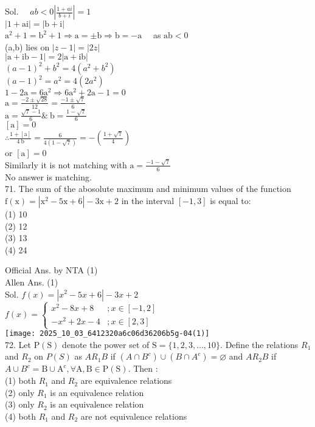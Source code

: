 \documentclass[10pt]{article}
\begin{document}
Sol. \(\quad a b<0\left|\frac{1+a i}{b+i}\right|=1\)\\
\(|1+\mathrm{ai}|=|\mathrm{b}+\mathrm{i}|\)\\
\(\mathrm{a}^{2}+1=\mathrm{b}^{2}+1 \Rightarrow \mathrm{a}= \pm \mathrm{b} \Rightarrow \mathrm{b}=-\mathrm{a} \quad\) as \(\mathrm{ab}<0\)\\
(a,b) lies on \(|z-1|=|2 z|\)\\
\(|\mathrm{a}+\mathrm{ib}-1|=2|\mathrm{a}+\mathrm{ib}|\)\\
\((a-1)^{2}+b^{2}=4\left(a^{2}+b^{2}\right)\)\\
\((a-1)^{2}=a^{2}=4\left(2 a^{2}\right)\)\\
\(1-2 \mathrm{a}=6 \mathrm{a}^{2} \Rightarrow 6 \mathrm{a}^{2}+2 \mathrm{a}-1=0\)\\
\(\mathrm{a}=\frac{-2 \pm \sqrt{28}}{12}=\frac{-1 \pm \sqrt{7}}{6}\)\\
\(\mathrm{a}=\frac{\sqrt{7}-1}{6} \& \mathrm{~b}=\frac{1-\sqrt{7}}{6}\)\\
\([\mathrm{a}]=0\)\\
\(\therefore \frac{1+[\mathrm{a}]}{4 \mathrm{~b}}=\frac{6}{4(1-\sqrt{7})}=-\left(\frac{1+\sqrt{7}}{4}\right)\)\\
or \([\mathrm{a}]=0\)\\
Similarly it is not matching with \(\mathrm{a}=\frac{-1-\sqrt{7}}{6}\)\\
No answer is matching.\\
71. The sum of the abosolute maximum and minimum values of the function \(\mathrm{f}(\mathrm{x})=\left|\mathrm{x}^{2}-5 \mathrm{x}+6\right|-3 \mathrm{x}+2\) in the interval \([-1,3]\) is equal to:\\
(1) 10\\
(2) 12\\
(3) 13\\
(4) 24

Official Ans. by NTA (1)\\
Allen Ans. (1)\\
Sol. \(f(x)=\left|x^{2}-5 x+6\right|-3 x+2\)\\
\(f(x)=\left\{\begin{array}{cc}x^{2}-8 x+8 & ; x \in[-1,2] \\ -x^{2}+2 x-4 & ; x \in[2,3]\end{array}\right.\)\\
\texttt{[image: 2025\_10\_03\_6412320a6c06d36206b5g-04(1)]}\\
72. Let \(\mathrm{P}(\mathrm{S})\) denote the power set of \(\mathrm{S}=\{1,2,3, \ldots, 10\}\). Define the relations \(R_{1}\) and \(R_{2}\) on \(P(S)\) as \(A R_{1} B\) if \(\left(A \cap B^{c}\right) \cup\left(B \cap A^{c}\right)=\varnothing\) and \(A R_{2} B\) if \(A \cup B^{c}= \mathrm{B} \cup \mathrm{A}^{\mathrm{c}}, \forall \mathrm{A}, \mathrm{B} \in \mathrm{P}(\mathrm{S})\). Then :\\
(1) both \(R_{1}\) and \(R_{2}\) are equivalence relations\\
(2) only \(R_{1}\) is an equivalence relation\\
(3) only \(R_{2}\) is an equivalence relation\\
(4) both \(R_{1}\) and \(R_{2}\) are not equivalence relations
\end{document}
